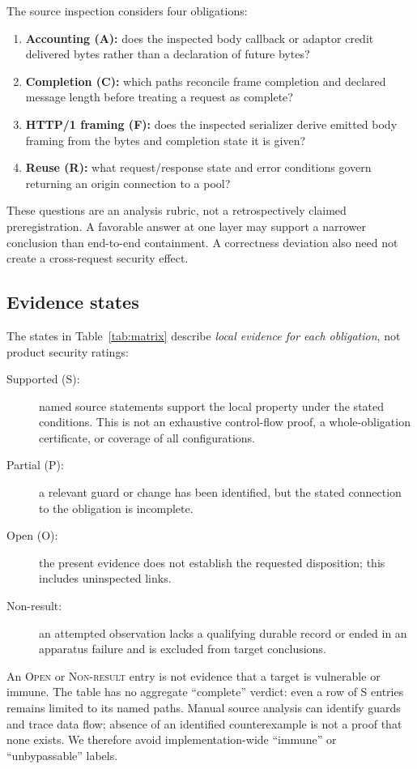 \documentclass[11pt,letterpaper]{article}
\newcommand{\state}[1]{\textsc{#1}}
\begin{document}
The source inspection considers four obligations:
\begin{enumerate}
\item \textbf{Accounting (A):} does the inspected body callback or adaptor credit delivered bytes rather than a declaration of future bytes?
\item \textbf{Completion (C):} which paths reconcile frame completion and declared message length before treating a request as complete?
\item \textbf{HTTP/1 framing (F):} does the inspected serializer derive emitted body framing from the bytes and completion state it is given?
\item \textbf{Reuse (R):} what request/response state and error conditions govern returning an origin connection to a pool?
\end{enumerate}
These questions are an analysis rubric, not a retrospectively claimed preregistration. A favorable answer at one layer may support a narrower conclusion than end-to-end containment. A correctness deviation also need not create a cross-request security effect.

\subsection{Evidence states}
The states in Table~\ref{tab:matrix} describe \emph{local evidence for each obligation}, not product security ratings:
\begin{description}
\item[Supported (S):] named source statements support the local property under the stated conditions. This is not an exhaustive control-flow proof, a whole-obligation certificate, or coverage of all configurations.
\item[Partial (P):] a relevant guard or change has been identified, but the stated connection to the obligation is incomplete.
\item[Open (O):] the present evidence does not establish the requested disposition; this includes uninspected links.
\item[Non-result:] an attempted observation lacks a qualifying durable record or ended in an apparatus failure and is excluded from target conclusions.
\end{description}
An \state{Open} or \state{Non-result} entry is not evidence that a target is vulnerable or immune. The table has no aggregate ``complete'' verdict: even a row of S entries remains limited to its named paths. Manual source analysis can identify guards and trace data flow; absence of an identified counterexample is not a proof that none exists. We therefore avoid implementation-wide ``immune'' or ``unbypassable'' labels.
\end{document}
